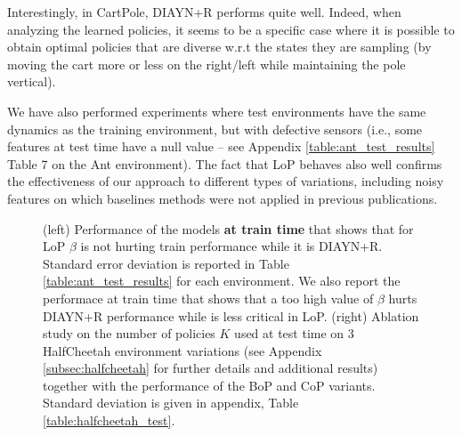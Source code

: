 Interestingly, in CartPole, DIAYN+R performs quite well. Indeed, when analyzing the learned policies, it seems to be a specific case where it is possible to obtain optimal policies that are diverse w.r.t the states they are sampling (by moving the cart more or less on the right/left while maintaining the pole vertical). 

We have also performed experiments  where test environments have the same dynamics as the training environment, but with defective sensors (i.e., some features at test time have a null value -- see Appendix  \ref{table:ant_test_results} Table 7 on the Ant environment). The fact that LoP behaves also well confirms the effectiveness of our approach to different types of variations, including noisy features on which baselines methods were not applied in previous publications.

\begin{figure}[t!]

\hspace{0.2cm}
\begin{subfigure}{0.5\textwidth}
\small{
 
}
\end{subfigure}
\begin{subfigure}{0.5\textwidth}

\end{subfigure}
\caption{%
(left) Performance of the models \textbf{at train time} that shows that for LoP $\beta$ is not hurting train performance while it is DIAYN+R. Standard error deviation is reported in Table \ref{table:ant_test_results} for each environment. We also report the performace at train time that shows that a too high value of $\beta$ hurts DIAYN+R performance while is less critical in LoP. (right) Ablation study on the number of policies $K$  used at test time on 3 HalfCheetah environment variations (see Appendix \ref{subsec:halfcheetah} for further details and additional results) together with the performance of the BoP and CoP variants. Standard deviation is given in appendix, Table \ref{table:halfcheetah_test}.}
\label{tab:beta_ablation}
    \vspace{-0.4cm}
\end{figure}

